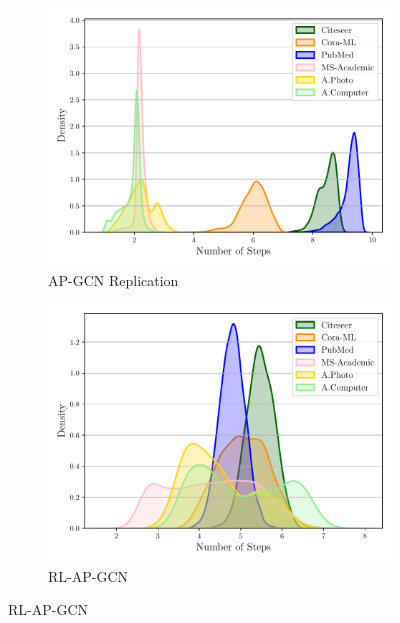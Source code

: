 \documentclass{gdl}
\begin{document}
\begin{figure}[p]
    \centering
    \begin{minipage}[t]{0.48\textwidth}
        \centering
        \begin{subfigure}[b]{0.7\textwidth}
            \centering
            \includegraphics[width=\textwidth]{Spinelli_steps_distribution.pdf}
            \captionsetup{justification=centerlast}
            \caption{AP-GCN Replication}
            \label{fig:step_dist_AP_GCN}
        \end{subfigure}
        
        \begin{subfigure}[b]{0.7\textwidth}
            \centering
            \includegraphics[width=\textwidth]{RL-AP-GCN_steps_distribution.pdf}
            \captionsetup{justification=centerlast}
            \caption{RL-AP-GCN}
            \label{fig:step_dist_RL_AP_GCN}
        \end{subfigure}
        

\end{minipage}
\end{figure}
\end{document}
